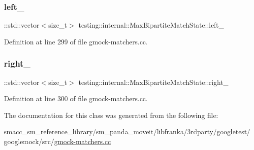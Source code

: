 \subsubsection{\texorpdfstring{left\+\_\+}{left\_}}
{\footnotesize\ttfamily \+::std\+::vector$<$size\+\_\+t$>$ testing\+::internal\+::\+Max\+Bipartite\+Match\+State\+::left\+\_\+\hspace{0.3cm}{\ttfamily [private]}}



Definition at line 299 of file gmock-\/matchers.\+cc.

\mbox{\label{classtesting_1_1internal_1_1MaxBipartiteMatchState_a85c29e270fd44f16458cf48cdc06d19a}} 
\subsubsection{\texorpdfstring{right\+\_\+}{right\_}}
{\footnotesize\ttfamily \+::std\+::vector$<$size\+\_\+t$>$ testing\+::internal\+::\+Max\+Bipartite\+Match\+State\+::right\+\_\+\hspace{0.3cm}{\ttfamily [private]}}



Definition at line 300 of file gmock-\/matchers.\+cc.



The documentation for this class was generated from the following file\+:\begin{DoxyCompactItemize}
\item 
smacc\+\_\+sm\+\_\+reference\+\_\+library/sm\+\_\+panda\+\_\+moveit/libfranka/3rdparty/googletest/googlemock/src/\hyperlink{gmock-matchers_8cc}{gmock-\/matchers.\+cc}\end{DoxyCompactItemize}
